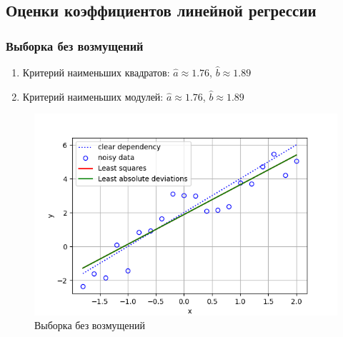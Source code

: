 \subsection{Оценки коэффициентов линейной регрессии}

	\subsubsection{Выборка без возмущений}
		\begin{enumerate}
			\item{Критерий наименьших квадратов:}
			$\hat{a}\approx 1.76$, $\hat{b}\approx 1.89$
			\item{Критерий наименьших модулей:}
			$\hat{a}\approx 1.76$, $\hat{b}\approx 1.89$
		\end{enumerate}
		\begin{figure}[H]
			\centering
			\includegraphics{part_linear_regression/figures/no_error}
			\caption{Выборка без возмущений}
			\label{w/o_pert}
		\end{figure}

